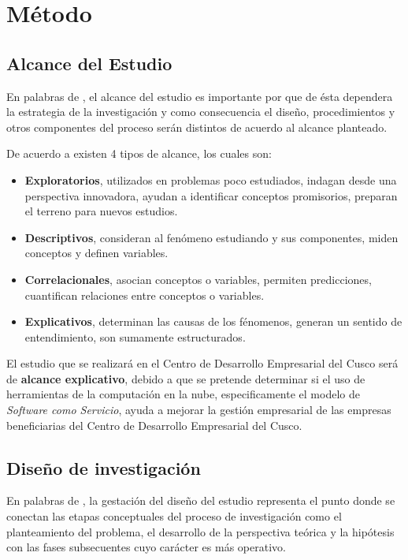 
\chapter{Método}
\section{Alcance del Estudio}
En palabras de \cite{sampieri}, el alcance del estudio es importante por que de
ésta dependera la estrategia de la investigación y como consecuencia el diseño,
procedimientos y otros componentes del proceso serán distintos de acuerdo al alcance
planteado.

De acuerdo a \cite{sampieri} existen 4 tipos de alcance, los cuales son:
\begin{itemize}
    \item \textbf{Exploratorios}, utilizados en problemas poco estudiados, indagan
          desde una perspectiva innovadora, ayudan a identificar conceptos promisorios,
          preparan el terreno para nuevos estudios.
    \item \textbf{Descriptivos}, consideran al fenómeno estudiando y sus componentes,
          miden conceptos y definen variables.
    \item \textbf{Correlacionales}, asocian conceptos o variables, permiten predicciones,
          cuantifican relaciones entre conceptos o variables.
    \item \textbf{Explicativos}, determinan las causas de los fénomenos, generan un
          sentido de entendimiento, son sumamente estructurados.
\end{itemize}

El estudio que se realizará en el Centro de Desarrollo Empresarial del Cusco será
de \textbf{alcance explicativo}, debido a que se pretende determinar si el uso
de herramientas de la computación en la nube, especificamente el modelo de
\emph{Software como Servicio}, ayuda a mejorar la gestión empresarial de las empresas
beneficiarias del Centro de Desarrollo Empresarial del Cusco.

\section{Diseño de investigación}
En palabras de \cite{sampieri}, la gestación del diseño del estudio representa
el punto donde se conectan las etapas conceptuales del proceso de investigación
como el planteamiento del problema, el desarrollo de la perspectiva teórica y
la hipótesis con las fases subsecuentes cuyo carácter es más operativo.

